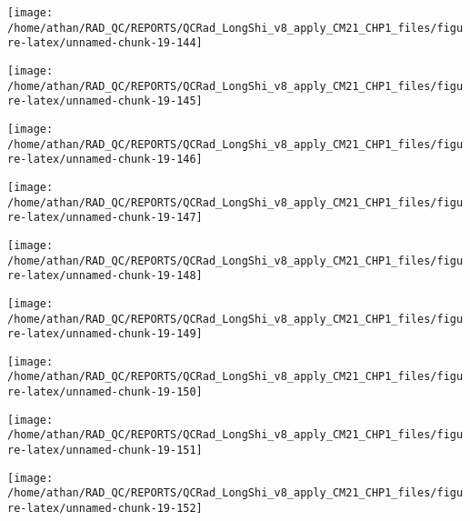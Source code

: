 \documentclass[
  10pt,
  a4paper,oneside]{article}
\begin{document}
\begin{center}\texttt{[image: /home/athan/RAD\_QC/REPORTS/QCRad\_LongShi\_v8\_apply\_CM21\_CHP1\_files/figure-latex/unnamed-chunk-19-144]} \end{center}

\begin{center}\texttt{[image: /home/athan/RAD\_QC/REPORTS/QCRad\_LongShi\_v8\_apply\_CM21\_CHP1\_files/figure-latex/unnamed-chunk-19-145]} \end{center}

\begin{center}\texttt{[image: /home/athan/RAD\_QC/REPORTS/QCRad\_LongShi\_v8\_apply\_CM21\_CHP1\_files/figure-latex/unnamed-chunk-19-146]} \end{center}

\begin{center}\texttt{[image: /home/athan/RAD\_QC/REPORTS/QCRad\_LongShi\_v8\_apply\_CM21\_CHP1\_files/figure-latex/unnamed-chunk-19-147]} \end{center}

\begin{center}\texttt{[image: /home/athan/RAD\_QC/REPORTS/QCRad\_LongShi\_v8\_apply\_CM21\_CHP1\_files/figure-latex/unnamed-chunk-19-148]} \end{center}

\begin{center}\texttt{[image: /home/athan/RAD\_QC/REPORTS/QCRad\_LongShi\_v8\_apply\_CM21\_CHP1\_files/figure-latex/unnamed-chunk-19-149]} \end{center}

\begin{center}\texttt{[image: /home/athan/RAD\_QC/REPORTS/QCRad\_LongShi\_v8\_apply\_CM21\_CHP1\_files/figure-latex/unnamed-chunk-19-150]} \end{center}

\begin{center}\texttt{[image: /home/athan/RAD\_QC/REPORTS/QCRad\_LongShi\_v8\_apply\_CM21\_CHP1\_files/figure-latex/unnamed-chunk-19-151]} \end{center}

\begin{center}\texttt{[image: /home/athan/RAD\_QC/REPORTS/QCRad\_LongShi\_v8\_apply\_CM21\_CHP1\_files/figure-latex/unnamed-chunk-19-152]} \end{center}
\end{document}
